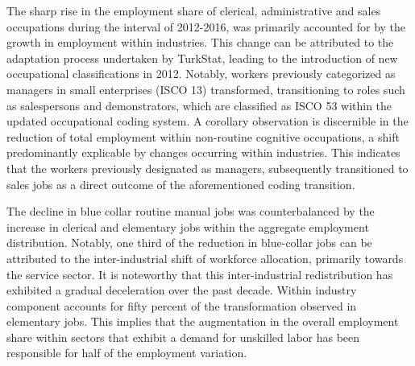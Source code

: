 \begin{onehalfspace}
The sharp rise in the employment share of clerical, administrative
and sales occupations during the interval of 2012-2016, was primarily
accounted for by the growth in employment within industries. This
change can be attributed to the adaptation process undertaken by TurkStat,
leading to the introduction of new occupational classifications in
2012. Notably, workers previously categorized as managers in small
enterprises (ISCO 13) transformed, transitioning to roles such as
salespersons and demonstrators, which are classified as ISCO 53 within
the updated occupational coding system. A corollary observation is
discernible in the reduction of total employment within non-routine
cognitive occupations, a shift predominantly explicable by changes
occurring within industries. This indicates that the workers previously
designated as managers, subsequently transitioned to sales jobs as
a direct outcome of the aforementioned coding transition.

The decline in blue collar routine manual jobs was counterbalanced
by the increase in clerical and elementary jobs within the aggregate
employment distribution. Notably, one third of the reduction in blue-collar
jobs can be attributed to the inter-industrial shift of workforce
allocation, primarily towards the service sector. It is noteworthy
that this inter-industrial redistribution has exhibited a gradual
deceleration over the past decade. Within industry component accounts
for fifty percent of the transformation observed in elementary jobs.
This implies that the augmentation in the overall employment share
within sectors that exhibit a demand for unskilled labor has been
responsible for half of the employment variation.
\end{onehalfspace}
\begin{center}

\par\end{center}

\vspace{-1cm}

